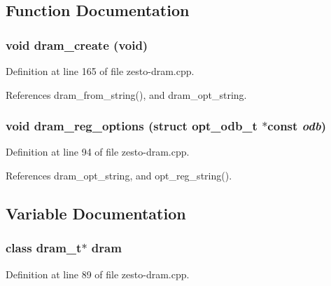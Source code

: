 \subsection{Function Documentation}
\subsubsection[{dram\_\-create}]{\setlength{\rightskip}{0pt plus 5cm}void dram\_\-create (void)}\label{zesto-dram_8h_213d02d3a2f53f24d8ac9e8956b64f13}




Definition at line 165 of file zesto-dram.cpp.

References dram\_\-from\_\-string(), and dram\_\-opt\_\-string.
\subsubsection[{dram\_\-reg\_\-options}]{\setlength{\rightskip}{0pt plus 5cm}void dram\_\-reg\_\-options (struct {\bf opt\_\-odb\_\-t} $\ast$const  {\em odb})}\label{zesto-dram_8h_ed0771b152d1f5deb1a8b7e4955f71a7}




Definition at line 94 of file zesto-dram.cpp.

References dram\_\-opt\_\-string, and opt\_\-reg\_\-string().

\subsection{Variable Documentation}
\subsubsection[{dram}]{\setlength{\rightskip}{0pt plus 5cm}class {\bf dram\_\-t}$\ast$ {\bf dram}}\label{zesto-dram_8h_a8026313a138e58afe2d5bff2f34dcfe}




Definition at line 89 of file zesto-dram.cpp.